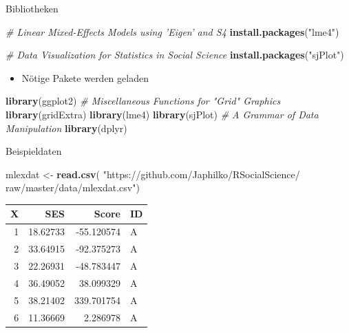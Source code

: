 \documentclass[ignorenonframetext,]{beamer}
\newenvironment{Shaded}{}{}
\newcommand{\KeywordTok}[1]{\textcolor[rgb]{0.00,0.44,0.13}{\textbf{{#1}}}}
\newcommand{\StringTok}[1]{\textcolor[rgb]{0.25,0.44,0.63}{{#1}}}
\newcommand{\CommentTok}[1]{\textcolor[rgb]{0.38,0.63,0.69}{\textit{{#1}}}}
\newcommand{\NormalTok}[1]{{#1}}
\providecommand{\tightlist}{%
\setlength{\itemsep}{0pt}\setlength{\parskip}{0pt}}
\begin{document}
\begin{frame}[fragile]{Bibliotheken}

\begin{Shaded}
\begin{Highlighting}[]
\CommentTok{# Linear Mixed-Effects Models using 'Eigen' and S4}
\KeywordTok{install.packages}\NormalTok{(}\StringTok{"lme4"}\NormalTok{)}

\CommentTok{# Data Visualization for Statistics in Social Science}
\KeywordTok{install.packages}\NormalTok{(}\StringTok{"sjPlot"}\NormalTok{)}
\end{Highlighting}
\end{Shaded}

\begin{itemize}
\tightlist
\item
  Nötige Pakete werden geladen
\end{itemize}

\begin{Shaded}
\begin{Highlighting}[]
\KeywordTok{library}\NormalTok{(ggplot2)}
\CommentTok{# Miscellaneous Functions for "Grid" Graphics}
\KeywordTok{library}\NormalTok{(gridExtra)}
\KeywordTok{library}\NormalTok{(lme4)}
\KeywordTok{library}\NormalTok{(sjPlot)}
\CommentTok{# A Grammar of Data Manipulation}
\KeywordTok{library}\NormalTok{(dplyr)}
\end{Highlighting}
\end{Shaded}

\end{frame}

\begin{frame}[fragile]{Beispieldaten}

\begin{Shaded}
\begin{Highlighting}[]
\NormalTok{mlexdat <-}\StringTok{ }\KeywordTok{read.csv}\NormalTok{(}
\StringTok{"https://github.com/Japhilko/RSocialScience/}
\StringTok{raw/master/data/mlexdat.csv"}\NormalTok{) }
\end{Highlighting}
\end{Shaded}

\begin{longtable}[]{@{}rrrl@{}}
\toprule
X & SES & Score & ID\tabularnewline
\midrule
\endhead
1 & 18.62733 & -55.120574 & A\tabularnewline
2 & 33.64915 & -92.375273 & A\tabularnewline
3 & 22.26931 & -48.783447 & A\tabularnewline
4 & 36.49052 & 38.099329 & A\tabularnewline
5 & 38.21402 & 339.701754 & A\tabularnewline
6 & 11.36669 & 2.286978 & A\tabularnewline
\bottomrule
\end{longtable}

\end{frame}
\end{document}
